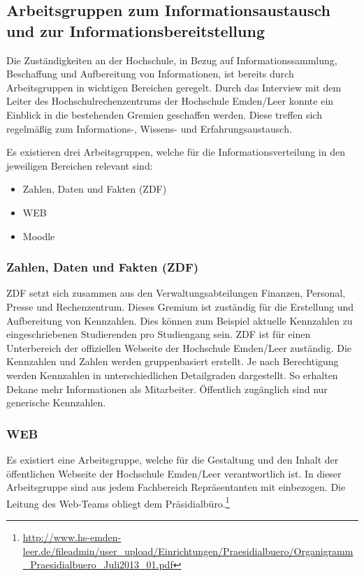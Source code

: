 \subsection{Arbeitsgruppen zum Informationsaustausch und zur Informationsbereitstellung}
\label{subsection_arbeitsgruppen_informationsaustausch}
Die Zuständigkeiten an der Hochschule, in Bezug auf Informationssammlung, Beschaffung und Aufbereitung von Informationen, ist bereits durch Arbeitsgruppen in wichtigen Bereichen geregelt. Durch das Interview mit dem Leiter des Hochschulrechenzentrums der Hochschule Emden/Leer konnte ein Einblick in die bestehenden Gremien geschaffen werden. Diese treffen sich regelmäßig zum Informations-, Wissens- und Erfahrungsaustausch.

Es existieren drei Arbeitsgruppen, welche für die Informationsverteilung in den jeweiligen Bereichen relevant sind:

\begin{itemize}
	\item Zahlen, Daten und Fakten (ZDF)
	\item WEB
	\item Moodle
\end{itemize}

\subsubsection{Zahlen, Daten und Fakten (ZDF)}
ZDF setzt sich zusammen aus den Verwaltungsabteilungen Finanzen, Personal, Presse und Rechenzentrum. Dieses Gremium ist zuständig für die Erstellung und Aufbereitung von Kennzahlen. Dies können zum Beispiel aktuelle Kennzahlen zu eingeschriebenen Studierenden pro Studiengang sein.  ZDF ist für einen Unterbereich der offiziellen Webseite der Hochschule Emden/Leer zuständig. Die Kennzahlen und Zahlen werden gruppenbasiert erstellt. Je nach Berechtigung werden Kennzahlen in unterschiedlichen Detailgraden dargestellt. So erhalten Dekane mehr Informationen als Mitarbeiter. Öffentlich zugänglich sind nur generische Kennzahlen. 

\subsubsection{WEB}
Es existiert eine Arbeitsgruppe, welche für die Gestaltung und den Inhalt der öffentlichen 
Webseite der Hochschule Emden/Leer verantwortlich ist. In dieser Arbeitsgruppe sind aus 
jedem Fachbereich Repräsentanten mit einbezogen. Die Leitung des Web-Teams obliegt dem Präsidialbüro.\footnote{\url{http://www.hs-emden-leer.de/fileadmin/user_upload/Einrichtungen/Praesidialbuero/Organigramm_Praesidialbuero_Juli2013_01.pdf}}


